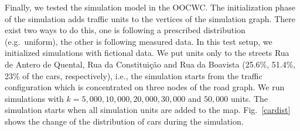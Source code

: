 \documentclass[b5paper,12pt]{report}
\theoremstyle{definition}
\begin{document}
Finally, we tested the simulation model in the OOCWC. The initialization phase of the simulation adds traffic units to the vertices of the simulation graph. There exist two ways to do this, one is following a prescribed distribution (e.g.~uniform), the other is following measured data. In this test setup, we initialized simulations with fictional data. We put units only to the streets Rua de Antero de Quental, Rua da Constitui\c{c}\~ao and Rua da Boavista (25.6\%, 51.4\%, 23\% of the cars, respectively), i.e., the simulation starts from the traffic configuration which is concentrated on three nodes of the road graph. We run simulations with $k=5,000, 10,000, 20,000, 30,000$ and $50,000$ units. The simulation starts when all simulation units are added to the map. Fig.~\ref{cardist} shows the change of the distribution of cars during the simulation.
\end{document}
